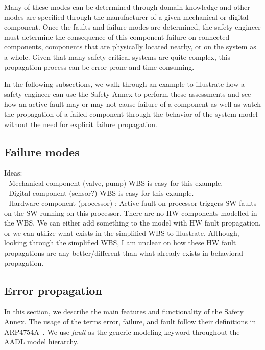 Many of these modes can be determined through domain knowledge and other modes are specified through the manufacturer of a given mechanical or digital component. Once the faults and failure modes are determined, the safety engineer must determine the consequence of this component failure on connected components, components that are physically located nearby, or on the system as a whole. Given that many safety critical systems are quite complex, this propagation process can be error prone and time consuming.

In the following subsections, we walk through an example to illustrate how a safety engineer can use the Safety Annex to perform these assessments and see how an active fault may or may not cause failure of a component as well as watch the propagation of a failed component through the behavior of the system model without the need for explicit failure propagation.

\subsection{Failure modes}
Ideas: \\
- Mechanical component (valve, pump) WBS is easy for this example.\\
- Digital component (sensor?) WBS is easy for this example.\\
- Hardware component (processor) : Active fault on processor triggers SW faults on the SW running on this processor. There are no HW components modelled in the WBS. We can either add something to the model with HW fault propagation, or we can utilize what exists in the simplified WBS to illustrate. Although, looking through the simplified WBS, I am unclear on how these HW fault propagations are any better/different than what already exists in behavioral propagation.\\


\subsection{Error propagation}







In this section, we describe the main features and functionality of the Safety Annex. The usage of the terms error, failure, and fault follow their definitions in ARP4754A~\cite{SAE:ARP4754A}. We use {\em fault} as the generic modeling keyword throughout the AADL model hierarchy.

